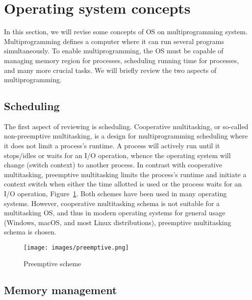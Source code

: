 \section[Operating system concepts]{Operating system concepts}

In this section, we will revise some concepts of OS on multiprogramming system. Multiprogramming defines a computer where it can run several programs simultaneously. To enable multiprogramming, the OS must be capable of managing memory region for processes, scheduling running time for processes, and many more crucial tasks. We will briefly review the two aspects of multiprogramming.

\subsection[Scheduling]{Scheduling}

The first aspect of reviewing is scheduling. Cooperative multitasking, or so-called non-preemptive multitasking, is a design for multiprogramming scheduling where it does not limit a process's runtime. A process will actively run until it stops/idles or waits for an I/O operation, whence the operating system will change (switch context) to another process. In contrast with cooperative multitasking, preemptive multitasking limits the process's runtime and initiate a context switch when either the time allotted is used or the process waits for an I/O operation, Figure~\ref{fig:preemptive}. Both schemes have been used in many operating systems. However, cooperative multitasking schema is not suitable for a multitasking OS, and thus in modern operating systems for general usage (Windows, macOS, and most Linux distributions), preemptive multitasking schema is chosen.

\begin{figure}[h]
  \centering
  \caption{Preemptive scheme}
  \label{fig:preemptive}
  \texttt{[image: images/preemptive.png]}
\end{figure}

\subsection[Memory management]{Memory management}

